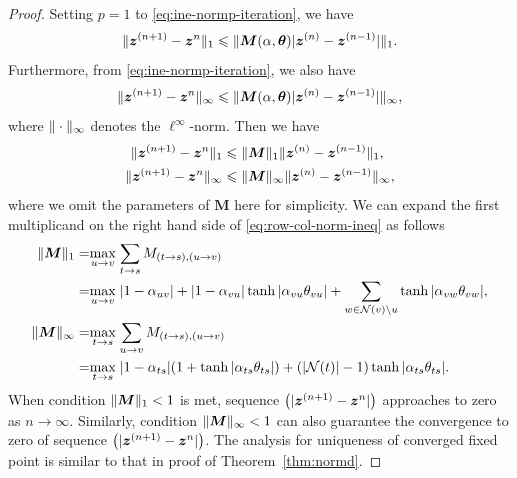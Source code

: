 \begin{proof}
  Setting $p=1$ to \eqref{eq:ine-normp-iteration}, we have
  \begin{equation}
    \| \bm{z}^{(n+1)} - \bm{z}^{n} \|_{1} \leqslant \| \bm{M}(\alpha, \bm{\theta})| \bm{z}^{(n)} - \bm{z}^{(n-1)} | \|_{1}.
  \end{equation}
  Furthermore, from \eqref{eq:ine-normp-iteration}, we also have
  \begin{equation}
    \| \bm{z}^{(n+1)} - \bm{z}^{n} \|_{\infty} \leqslant \| \bm{M}(\alpha, \bm{\theta})| \bm{z}^{(n)} - \bm{z}^{(n-1)} | \|_{\infty},
  \end{equation}
  where $\| \cdot \|_{\infty}$ denotes the $\ell^{\infty}$-norm.
  Then we have
  \begin{align}\label{eq:row-col-norm-ineq}
    \| \bm{z}^{(n+1)} - \bm{z}^{n} \|_{1} &\leqslant \| \bm{M} \|_{1}\| \bm{z}^{(n)} - \bm{z}^{(n-1)} \|_{1}, \nonumber \\
    \| \bm{z}^{(n+1)} - \bm{z}^{n} \|_{\infty} &\leqslant \| \bm{M} \|_{\infty}\| \bm{z}^{(n)} - \bm{z}^{(n-1)} \|_{\infty},
  \end{align}
  where we omit the parameters of $\bm{M}$ here for simplicity. We can expand the first multiplicand on the right hand side of \eqref{eq:row-col-norm-ineq} as follows
  \begin{align}
    \| \bm{M} \|_{1} =& \underset{u \rightarrow v}{\max}\;{\sum_{t\rightarrow s} M_{(t\rightarrow s), (u\rightarrow v)}} \nonumber \\
    =& \underset{u \rightarrow v}{\max}\;| 1-\alpha_{uv} | + | 1-\alpha_{vu} |\tanh{| \alpha_{vu} \theta_{vu} |} + \sum_{w\in \mathcal{N}(v) \backslash u} \tanh{| \alpha_{{vw}} \theta_{vw} |}, \nonumber \\
    \| \bm{M} \|_{\infty} =& \underset{t \rightarrow s}{\max}\;{\sum_{u\rightarrow v} M_{(t\rightarrow s), (u\rightarrow v)}} \nonumber \\
    =& \underset{t \rightarrow s}{\max}\; | 1-\alpha_{ts} | (1 + \tanh| \alpha_{ts} \theta_{ts} |) + (| \mathcal{N}(t) |-1)\tanh| \alpha_{ts} \theta_{ts} |.
  \end{align}
  When condition $\| \bm{M} \|_{1} < 1$ is met, sequence $\left( | \bm{z}^{(n+1)} - \bm{z}^{n} | \right)$ approaches to zero as $n\rightarrow \infty$. Similarly, condition $\| \bm{M} \|_{\infty}<1$ can also guarantee the convergence to zero of sequence $\left( | \bm{z}^{(n+1)} - \bm{z}^{n} | \right)$. The analysis for uniqueness of converged fixed point is similar to that in proof of Theorem~\ref{thm:normd}.
\end{proof}
